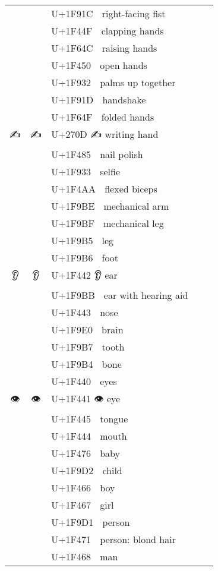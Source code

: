 \documentclass[a4paper,12pt]{ltjarticle}
\newcommand{\fontA}[1]{{\fontspec[RawFeature={mode=harf,+dist,+ccmp}]{Segoe UI Emoji} #1}}
\newcommand{\fontB}[1]{{\fontspec[RawFeature={mode=harf,+dist,+ccmp}]{Noto Color Emoji} #1}}
\begin{document}
\begin{longtable}[c]{ccp{0.8\linewidth}}
\fontA{🤜}&\fontB{🤜}&U+1F91C 🤜 right-facing fist\\
\fontA{👏}&\fontB{👏}&U+1F44F 👏 clapping hands\\
\fontA{🙌}&\fontB{🙌}&U+1F64C 🙌 raising hands\\
\fontA{👐}&\fontB{👐}&U+1F450 👐 open hands\\
\fontA{🤲}&\fontB{🤲}&U+1F932 🤲 palms up together\\
\fontA{🤝}&\fontB{🤝}&U+1F91D 🤝 handshake\\
\fontA{🙏}&\fontB{🙏}&U+1F64F 🙏 folded hands\\
\fontA{✍}&\fontB{✍}&U+270D ✍ writing hand\\
\fontA{💅}&\fontB{💅}&U+1F485 💅 nail polish\\
\fontA{🤳}&\fontB{🤳}&U+1F933 🤳 selfie\\
\fontA{💪}&\fontB{💪}&U+1F4AA 💪 flexed biceps\\
\fontA{🦾}&\fontB{🦾}&U+1F9BE 🦾 mechanical arm\\
\fontA{🦿}&\fontB{🦿}&U+1F9BF 🦿 mechanical leg\\
\fontA{🦵}&\fontB{🦵}&U+1F9B5 🦵 leg\\
\fontA{🦶}&\fontB{🦶}&U+1F9B6 🦶 foot\\
\fontA{👂}&\fontB{👂}&U+1F442 👂 ear\\
\fontA{🦻}&\fontB{🦻}&U+1F9BB 🦻 ear with hearing aid\\
\fontA{👃}&\fontB{👃}&U+1F443 👃 nose\\
\fontA{🧠}&\fontB{🧠}&U+1F9E0 🧠 brain\\
\fontA{🦷}&\fontB{🦷}&U+1F9B7 🦷 tooth\\
\fontA{🦴}&\fontB{🦴}&U+1F9B4 🦴 bone\\
\fontA{👀}&\fontB{👀}&U+1F440 👀 eyes\\
\fontA{👁}&\fontB{👁}&U+1F441 👁 eye\\
\fontA{👅}&\fontB{👅}&U+1F445 👅 tongue\\
\fontA{👄}&\fontB{👄}&U+1F444 👄 mouth\\
\fontA{👶}&\fontB{👶}&U+1F476 👶 baby\\
\fontA{🧒}&\fontB{🧒}&U+1F9D2 🧒 child\\
\fontA{👦}&\fontB{👦}&U+1F466 👦 boy\\
\fontA{👧}&\fontB{👧}&U+1F467 👧 girl\\
\fontA{🧑}&\fontB{🧑}&U+1F9D1 🧑 person\\
\fontA{👱}&\fontB{👱}&U+1F471 👱 person: blond hair\\
\fontA{👨}&\fontB{👨}&U+1F468 👨 man\\

\end{longtable}
\end{document}
